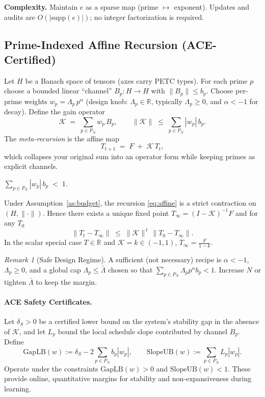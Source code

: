 \documentclass[11pt]{article}
\theoremstyle{definition}
\theoremstyle{remark}
\newtheorem{remark}[theorem]{Remark}
\newcommand{\1}{\mathbf{1}}
\begin{document}
\noindent\textbf{Complexity.}
Maintain $e$ as a sparse map (prime $\mapsto$ exponent). Updates and audits are $O(|\mathrm{supp}(e)|)$; no integer factorization is required.

\subsection{Prime-Indexed Affine Recursion (ACE-Certified)}
Let $H$ be a Banach space of tensors (axes carry PETC types).
For each prime $p$ choose a bounded linear ``channel'' $B_p:H\!\to\!H$ with $\|B_p\|\le b_p$.
Choose per-prime weights $w_p=\Lambda_p\,p^{\alpha}$ (design knob: $\Lambda_p\in\mathbb{R}$, typically $\Lambda_p\ge 0$, and $\alpha< -1$ for decay).
Define the gain operator
\[
  \mathcal{K}\;=\;\sum_{p\in P_N} w_p\,B_p,
\qquad
  \|\mathcal{K}\| \;\le\; \sum_{p\in P_N} |w_p|\,b_p.
\]
The \emph{meta-recursion} is the affine map
\begin{equation}
  \label{eq:affine}
  T_{t+1} \;=\; F \;+\; \mathcal{K}\,T_t,
\end{equation}
which collapses your original sum into an operator form while keeping primes as explicit channels.

\begin{assumption}\label{as:budget}
$\displaystyle \sum_{p\in P_N} |w_p|\,b_p \;<\;1.$
\end{assumption}

\begin{theorem}
Under Assumption~\ref{as:budget}, the recursion \eqref{eq:affine} is a strict contraction on $(H,\|\cdot\|)$.
Hence there exists a unique fixed point $T_\infty = (I-\mathcal{K})^{-1}F$ and for any $T_0$
\[
  \|T_{t}-T_\infty\| \;\le\; \|\mathcal{K}\|^{\,t}\,\|T_0-T_\infty\|.
\]
In the scalar special case $T\in\mathbb{R}$ and $\mathcal{K}=k\in(-1,1)$, $T_\infty=\frac{F}{1-k}$.
\end{theorem}

\begin{remark}[Safe Design Regime]
A sufficient (not necessary) recipe is $\alpha< -1$, $\Lambda_p\ge 0$, and a global cap $\Lambda_p\le \bar\Lambda$ chosen so that
$\sum_{p\in P_N} \Lambda_p p^{\alpha} b_p < 1$. Increase $N$ or tighten $\bar\Lambda$ to keep the margin.
\end{remark}

\paragraph{ACE Safety Certificates.}
Let $\delta_S>0$ be a certified lower bound on the system's stability gap in the absence of $\mathcal{K}$,
and let $L_p$ bound the local schedule slope contributed by channel $B_p$.
Define
\[
  \mathrm{GapLB}(w) := \delta_S - 2\sum_{p\in P_N} b_p |w_p|, 
  \qquad
  \mathrm{SlopeUB}(w) := \sum_{p\in P_N} L_p |w_p|.
\]
Operate under the constraints $\mathrm{GapLB}(w)>0$ and $\mathrm{SlopeUB}(w)<1$.
These provide online, quantitative margins for stability and non-expansiveness during learning.
\end{document}
